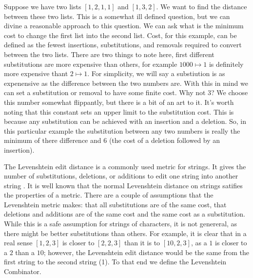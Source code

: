 \begin{example}
    Suppose we have two lists $[1, 2, 1, 1]$ and $[1, 3, 2]$.
    We want to find the distance between these two lists. 
    This is a somewhat ill defined question,
    but we can divine a reasonable approach to this question.
    We can ask what is the minimum cost to change the first list into the second list.
    Cost, for this example, can be defined as the fewest insertions, substitutions, and removals required to convert between the two lists.
    There are two things to note here, first different substitutions are more expensive than others,
    for example $1000 \mapsto 1$ is definitely more expensive thant $2 \mapsto 1$.
    For simplicity, we will say a substiution is as expenensive as the difference between the two numbers are.
    With this in mind we can set a substitution or removal to have some finite cost. Why not $3$?
    We choose this number somewhat flippantly, but there is a bit of an art to it.
    It's worth noting that this constant sets an upper limit to the substitution cost.
    This is because any substitution can be achieved with an insertion and a deletion.
    So, in this particular example the substitution between any two numbers is really the minimum of there difference and $6$ (the cost of a deletion followed by an insertion).
\end{example}

The Levenshtein edit distance is a commonly used metric for strings.
It gives the number of substitutions, deletions, or additions to edit one string into another string \cite{wiki:levenshtein}.
It is well known that the normal Levenshtein distance on strings satifies the properties of a metric.
There are a couple of assumptions that the Levenshtein metric makes:
that all substitutions are of the same cost,
that deletions and additions are of the same cost and the same cost as a substitution.
While this is a safe assumption for strings of characters,
it is not genereral, as there might be better substitutions than others.
For example, 
it is clear that in a real sense $[1, 2, 3]$ is closer to $[2, 2, 3]$ than it is to $[10, 2, 3]$,
as a $1$ is closer to a $2$ than a $10$;
however, the Levenshtein edit distance would be the same from the first string to the second string (1).
To that end we define the Levenshtein Combinator.

